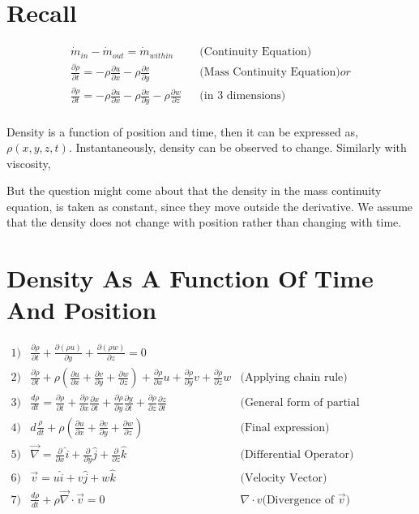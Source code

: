 \documentclass{report}
\begin{document}
\section{Recall}
\begin{align*}
  \dot{m}_{in} - \dot{m}_{out} = \dot{m}_{within} & &\text{(Continuity Equation)} \\
  \frac{\partial \rho}{\partial t} = -\rho \frac{\partial u}{\partial x} - \rho \frac{\partial v}{\partial y} & &\text{(Mass Continuity Equation)} or \\
  \frac{\partial \rho}{\partial t} = -\rho \frac{\partial u}{\partial x} - \rho \frac{\partial v}{\partial y} -\rho \frac{\partial w}{\partial z} & &\text{(in 3 dimensions)} \\
\end{align*}

Density is a function of position and time, then it can be expressed as, $\rho(x,y,z,t)$. Instantaneously, density can be observed to change. Similarly with viscosity,

But the question might come about that the density in the mass continuity equation, is taken as constant, since they move outside the derivative. We assume that the density does not change with position rather than changing with time.

\section{Density As A Function Of Time And Position}
\begin{align*}
  1) &\frac{\partial \rho}{\partial t} + \frac{\partial (\rho u)}{\partial y} + \frac{\partial (\rho w)}{\partial z} = 0 \\
  2) &\frac{\partial \rho}{\partial t} + \rho (\frac{\partial u}{\partial x} + \frac{\partial v}{\partial y} + \frac{\partial w}{\partial z}) + \frac{\partial \rho}{\partial x} u + \frac{\partial \rho}{\partial y}v + \frac{\partial \rho}{\partial z} w &\text{(Applying chain rule)} \\
  3) &\frac{d \rho}{dt} = \frac{\partial \rho}{\partial t} + \frac{\partial \rho}{\partial x}\frac{\partial x}{\partial t} + \frac{\partial \rho}{\partial y}\frac{\partial y}{\partial t} + \frac{\partial \rho}{\partial z}\frac{\partial z}{\partial t} &\text{(General form of partial derivatives to total derivatives)} \\
  4) & d\frac{\rho}{dt} + \rho(\frac{\partial u}{\partial x} + \frac{\partial v}{\partial y} + \frac{\partial w}{\partial z}) &\text{(Final expression)} \\
  5) & \vec{\nabla}  = \frac{\partial }{\partial x} \hat{i} + \frac{\partial }{\partial y} \hat{j} + \frac{\partial }{\partial z} \hat{k} &\text{(Differential Operator)} \\
  6) &\vec{v} = u \hat{i} + v \hat{j} + w \hat{k} &\text{(Velocity Vector)} \\
  7)&\frac{d \rho}{dt} + \rho \vec{\nabla}\cdot{\vec{v}} = 0 &{\nabla \cdot v \text{(Divergence of $\vec{v}$)}}
\end{align*}
\end{document}
